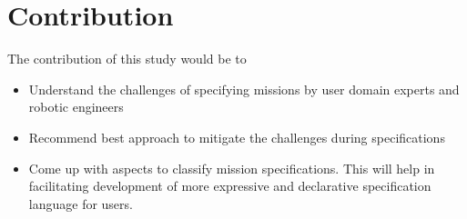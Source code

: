 \section{Contribution}
The contribution of this study would be to
\begin{itemize}
    \item Understand the challenges of specifying missions by user domain experts and robotic engineers
    \item Recommend best approach to mitigate the challenges during specifications
    \item Come up with aspects to classify mission specifications. This will help in facilitating development of more expressive and declarative specification language for users.
\end{itemize}